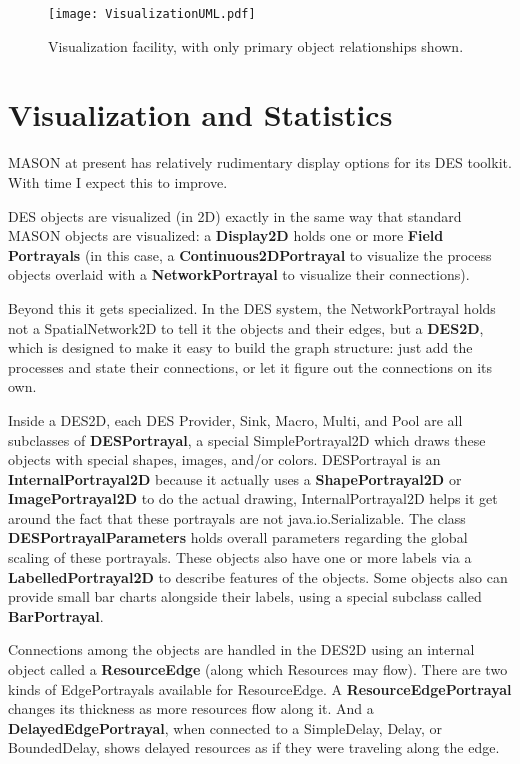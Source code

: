 \documentclass[twoside,10pt]{article}
\newcommand\bump{\vspace{10in}}
\begin{document}
\begin{figure}[t]
\centering\texttt{[image: VisualizationUML.pdf]}
\caption{Visualization facility, with only primary object relationships shown.}
\end{figure}


\bump
\section{Visualization and Statistics}

MASON at present has relatively rudimentary display options for its DES toolkit.  With time I expect this to improve.

DES objects are visualized (in 2D) exactly in the same way that standard MASON objects are visualized: a {\bf Display2D} holds one or more {\bf Field Portrayals} (in this case, a {\bf Continuous2DPortrayal} to visualize the process objects overlaid with a {\bf NetworkPortrayal} to visualize their connections).  

Beyond this it gets specialized.  In the DES system, the NetworkPortrayal holds not a SpatialNetwork2D to tell it the objects and their edges, but a {\bf DES2D}, which is designed to make it easy to build the graph structure: just add the processes and state their connections, or let it figure out the connections on its own.   

Inside a DES2D, each DES Provider, Sink, Macro, Multi, and Pool are all subclasses of {\bf DESPortrayal}, a special SimplePortrayal2D which draws these objects with special shapes, images, and/or colors.    DESPortrayal is an {\bf InternalPortrayal2D} because it actually uses a {\bf ShapePortrayal2D} or {\bf ImagePortrayal2D} to do the actual drawing, InternalPortrayal2D helps it get around the fact that these portrayals are not java.io.Serializable.  The class {\bf DESPortrayalParameters} holds overall parameters regarding the global scaling of these portrayals.  These objects also have one or more labels via a {\bf LabelledPortrayal2D} to describe features of the objects.  Some objects also can provide small bar charts alongside their labels, using a special subclass called {\bf BarPortrayal}.

Connections among the objects are handled in the DES2D using an internal object called a {\bf ResourceEdge} (along which Resources may flow).  There are two kinds of EdgePortrayals available for ResourceEdge.  A {\bf ResourceEdgePortrayal} changes its thickness as more resources flow along it.  And a {\bf DelayedEdgePortrayal}, when connected to a SimpleDelay, Delay, or BoundedDelay, shows delayed resources as if they were traveling along the edge.
\end{document}
